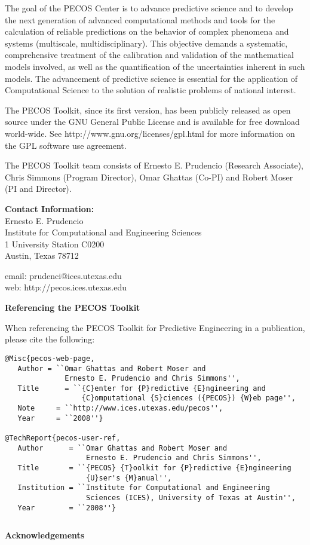 The goal of the PECOS Center is
to advance predictive science and to develop the next generation of advanced computational methods and tools
for the calculation of reliable predictions on the behavior of complex phenomena and systems (multiscale, multidisciplinary).
This objective demands a systematic, comprehensive treatment of the calibration and validation of the mathematical models involved,
as well as the quantification of the uncertainties inherent in such models.
The advancement of predictive science is essential for the application of Computational Science to the solution of realistic problems of national interest.

The PECOS Toolkit, since its first version, has been publicly released as open source
under the GNU General Public License and is available for free download world-wide.
See http://www.gnu.org/licenses/gpl.html for more information on the GPL software use agreement.

The PECOS Toolkit team consists of
Ernesto E. Prudencio (Research Associate),
Chris Simmons (Program Director),
Omar Ghattas (Co-PI) and
Robert Moser (PI and Director).

{\bf Contact Information:}\\
Ernesto E. Prudencio\\
Institute for Computational and Engineering Sciences\\
1 University Station C0200\\
Austin, Texas 78712

email: prudenci@ices.utexas.edu\\
web: http://pecos.ices.utexas.edu\\
$~$\\

\centerline{\bf Referencing the PECOS Toolkit}

When referencing the PECOS Toolkit for Predictive Engineering in a publication, please cite the following:
\begin{verbatim}
@Misc{pecos-web-page,
   Author = ``Omar Ghattas and Robert Moser and
              Ernesto E. Prudencio and Chris Simmons'',
   Title      = ``{C}enter for {P}redictive {E}ngineering and
                  {C}omputational {S}ciences ({PECOS}) {W}eb page'',
   Note     = ``http://www.ices.utexas.edu/pecos'',
   Year     = ``2008''}

@TechReport{pecos-user-ref,
   Author      = ``Omar Ghattas and Robert Moser and
                   Ernesto E. Prudencio and Chris Simmons'',
   Title       = ``{PECOS} {T}oolkit for {P}redictive {E}ngineering
                   {U}ser's {M}anual'',
   Institution = ``Institute for Computational and Engineering
                   Sciences (ICES), University of Texas at Austin'',
   Year        = ``2008''}
\end{verbatim}
$~$\\
$~$\\

\centerline{\bf Acknowledgements}

